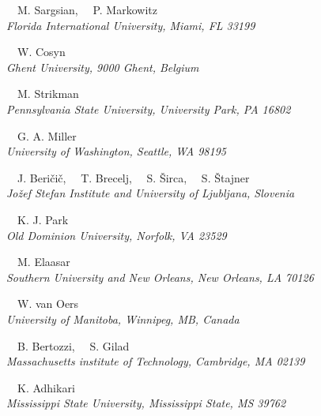 \begin{center}
\vspace{10px}

{~~M. Sargsian,
~~P. Markowitz}\\
\ls
{\normalsize\it{Florida International University, Miami, FL 33199}}

\vspace{10px}

{~~W. Cosyn}\\
\ls
{\normalsize\it{Ghent University, 9000 Ghent, Belgium}}

\vspace{10px}

{~~M. Strikman}\\
\ls
{\normalsize\it{Pennsylvania State University, University Park, PA 16802}}

\vspace{10px}

{~~G. A. Miller}\\
\ls
{\normalsize\it{University of Washington, Seattle, WA 98195}}

\vspace{10px}

{~~J. Beri\v{c}i\v{c}, 
~~T. Brecelj, 
~~S. \v{S}irca, 
~~S. \v{S}tajner} \\
\ls
{\normalsize\it{Jo\v{z}ef Stefan Institute and University of Ljubljana, Slovenia}}

\vspace{10px}

{~~K. J. Park}\\
\ls
{\normalsize\it{Old Dominion University, Norfolk, VA 23529}}

\vspace{10px}

{~~M. Elaasar}\\
\ls
{\normalsize\it{Southern University and New Orleans, New Orleans, LA 70126}}

\vspace{10px}

{~~W. van Oers}\\
\ls
{\normalsize\it{University of Manitoba, Winnipeg, MB, Canada}}

\vspace{10px}

{~~B. Bertozzi,
~~S. Gilad}\\
\ls
{\normalsize\it{Massachusetts institute of Technology, Cambridge, MA 02139}}

\vspace{10px}

{~~K. Adhikari}\\
\ls
{\normalsize\it{Mississippi State University, Mississippi State, MS 39762}}
\ks

%



\end{center}


\setcounter{footnote}{0}
